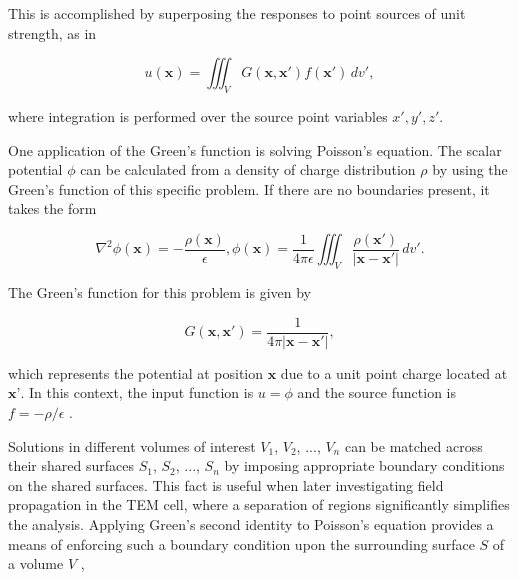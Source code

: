This is accomplished by superposing the responses to point sources of unit strength, as in \cite[p.~512]{Arfken_Weber_Harris_2013}

\begin{equation}
    u(\mathbf{x})=\iiint_V G(\mathbf{x},\mathbf{x'})f(\mathbf{x'})\,dv',
    \label{eqn:examplary_function_solved}
\end{equation}

where integration is performed over the source point variables $x', y', z'$. 

One application of the Green's function is solving Poisson's equation. The scalar potential $\phi$ can be calculated from a density of charge distribution $\rho$ by using the Green's function of this specific problem. If there are no boundaries present, it takes the form \cites[pp.~510-511]{Arfken_Weber_Harris_2013}[p.~56]{Collin_2015}

\begin{subequations}
	\begin{equation}
		\nabla ^ 2 \phi(\mathbf{x}) = -\frac{\rho(\mathbf{x})}{\epsilon},
		\label{eqn:greens_function_scalar_pot_1}
	\end{equation}
	\begin{equation}
		\phi(\mathbf{x}) = \frac{1}{4\pi\epsilon}\iiint_V\frac{\rho(\mathbf{x'})}{|\mathbf{x}-\mathbf{x'}|}\,dv'.
		\label{eqn:greens_function_scalar_pot_2}
	\end{equation}
\end{subequations}

The Green’s function for this problem is given by

\begin{equation}
	G(\mathbf{x},\mathbf{x'}) = \frac{1}{4\pi |\mathbf{x}-\mathbf{x'}|},
\end{equation}

which represents the potential at position $\mathbf{x}$ due to a unit point charge located at $\mathbf{x’}$. In this context, the input function is $u = \phi$ and the source function is $f = -\rho / \epsilon$ \cite[pp.~510-511]{Arfken_Weber_Harris_2013}.

Solutions in different volumes of interest $V_1$, $V_2$, $...$, $V_n$ can be matched across their shared surfaces $S_1$, $S_2$, $...$, $S_n$ by imposing appropriate boundary conditions on the shared surfaces. This fact is useful when later investigating field propagation in the TEM cell, where a separation of regions significantly simplifies the analysis. Applying Green's second identity to Poisson's equation provides a means of enforcing such a boundary condition upon the surrounding surface $S$ of a volume $V$ \cites[p.~511]{Arfken_Weber_Harris_2013}[p.~57]{Collin_2015}, 

